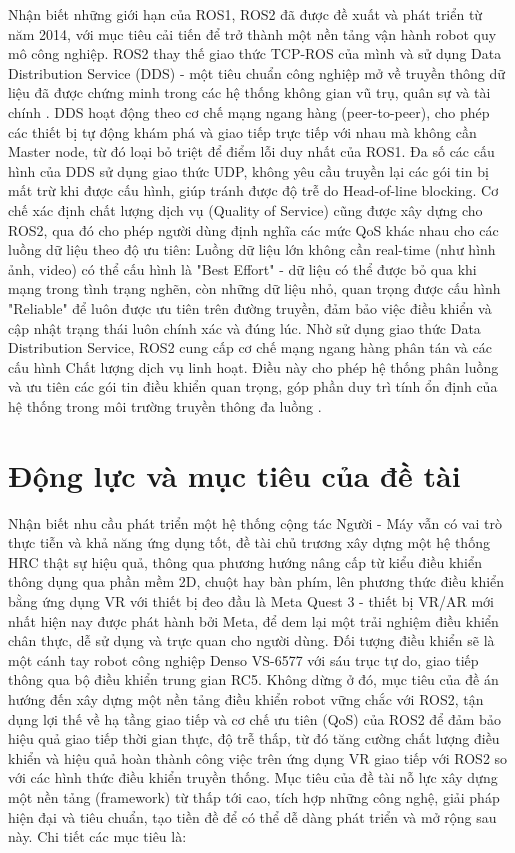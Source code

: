 Nhận biết những giới hạn của ROS1, ROS2 đã được đề xuất và phát triển từ năm 2014, với mục tiêu cải tiến để trở thành một nền tảng vận hành robot quy mô công nghiệp. ROS2 thay thế giao thức TCP-ROS của mình và sử dụng Data Distribution Service (DDS) - một tiêu chuẩn công nghiệp mở về truyền thông dữ liệu đã được chứng minh trong các hệ thống không gian vũ trụ, quân sự và tài chính \cite{macenski2022robot}. DDS hoạt động theo cơ chế mạng ngang hàng (peer-to-peer), cho phép các thiết bị tự động khám phá và giao tiếp trực tiếp với nhau mà không cần Master node, từ đó loại bỏ triệt để điểm lỗi duy nhất của ROS1. Đa số các cấu hình của DDS sử dụng giao thức UDP, không yêu cầu truyền lại các gói tin bị mất trừ khi được cấu hình, giúp tránh được độ trễ do Head-of-line blocking. Cơ chế xác định chất lượng dịch vụ (Quality of Service) cũng được xây dựng cho ROS2, qua đó cho phép người dùng định nghĩa các mức QoS khác nhau cho các luồng dữ liệu theo độ ưu tiên: Luồng dữ liệu lớn không cần real-time (như hình ảnh, video) có thể cấu hình là "Best Effort" - dữ liệu có thể được bỏ qua khi mạng trong tình trạng nghẽn, còn những dữ liệu nhỏ, quan trọng được cấu hình "Reliable" để luôn được ưu tiên trên đường truyền, đảm bảo việc điều khiển và cập nhật trạng thái luôn chính xác và đúng lúc. Nhờ sử dụng giao thức Data Distribution Service, ROS2 cung cấp cơ chế mạng ngang hàng phân tán và các cấu hình Chất lượng dịch vụ linh hoạt. Điều này cho phép hệ thống phân luồng và ưu tiên các gói tin điều khiển quan trọng, góp phần duy trì tính ổn định của hệ thống trong môi trường truyền thông đa luồng \cite{macenski2022robot, ali2025digital}.

\section{Động lực và mục tiêu của đề tài}

Nhận biết nhu cầu phát triển một hệ thống cộng tác Người - Máy vẫn có vai trò thực tiễn và khả năng ứng dụng tốt, đề tài chủ trương xây dựng một hệ thống HRC thật sự hiệu quả, thông qua phương hướng nâng cấp từ kiểu điều khiển thông dụng qua phần mềm 2D, chuột hay bàn phím, lên phương thức điều khiển bằng ứng dụng VR với thiết bị đeo đầu là Meta Quest 3 - thiết bị VR/AR mới nhất hiện nay được phát hành bởi Meta, để dem lại một trải nghiệm điều khiển chân thực, dễ sử dụng và trực quan cho người dùng. Đối tượng điều khiển sẽ là một cánh tay robot công nghiệp Denso VS-6577 với sáu trục tự do, giao tiếp thông qua bộ điều khiển trung gian RC5. Không dừng ở đó, mục tiêu của đề án hướng đến xây dựng một nền tảng điều khiển robot vững chắc với ROS2, tận dụng lợi thế về hạ tầng giao tiếp và cơ chế ưu tiên (QoS) của ROS2 để đảm bảo hiệu quả giao tiếp thời gian thực, độ trễ thấp, từ đó tăng cường chất lượng điều khiển và hiệu quả hoàn thành công việc trên ứng dụng VR giao tiếp với ROS2 so với các hình thức điều khiển truyền thống. Mục tiêu của đề tài nỗ lực xây dựng một nền tảng (framework) từ thấp tới cao, tích hợp những công nghệ, giải pháp hiện đại và tiêu chuẩn, tạo tiền đề để có thể dễ dàng phát triển và mở rộng sau này. Chi tiết các mục tiêu là:

